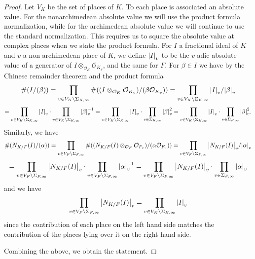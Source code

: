 \documentclass[12pt]{amsart}
\theoremstyle{remark}
\theoremstyle{definition}
\begin{document}
\begin{proof} Let $V_K$ be the set of places of $K$. To each place is associated an absolute value. For the nonarchimedean absolute value we will use the product formula normalization, while for the archimedean absolute value we will continue to use the standard normalization. This requires us to square the absolute value at complex places when we state the product formula. For $I$ a fractional ideal of $K$ and $v$ a non-archimedean place of $K$, we define $\abs{I}_v$ to be the $v$-adic absolute value of a generator of $I \otimes_{\mathcal O_K} \mathcal O_{K_v}$, and the same for $F$. For $\beta \in I$ we have by the Chinese remainder theorem and the product formula
\[ \# (I/(\beta)) =\prod_{v \in V_K\setminus \Sigma_{K,\infty}} \# ((I \otimes_{\mathcal O_K} \mathcal O_{K_v})/ (\beta \mathcal O_{K_v})) =\prod_{v \in V_K\setminus \Sigma_{K,\infty}} \abs{I}_v/ \abs{\beta}_v \] \[= \prod_{v \in V_K\setminus \Sigma_{K,\infty}} \abs{I}_v \cdot \prod_{v \in V_K\setminus \Sigma_{K,\infty}}\abs{\beta}_v^{-1}=  \prod_{v \in V_K\setminus \Sigma_{K,\infty}} \abs{I}_v \cdot \prod_{v \in \Sigma_{K,\infty} }\abs{\beta}_v^2 =  \prod_{v \in V_K\setminus \Sigma_{K,\infty}} \abs{I}_v \cdot \prod_{v \in \Sigma_{F,\infty}} \abs{\beta}_v^2.\]
Similarly, we have
\[ \# (N_{K/F}(I)/(\alpha)) =  \prod_{v \in V_F\setminus \Sigma_{F,\infty}} \# (( N_{K/F}(I)\otimes_{\mathcal O_F} \mathcal O_{F_v})/(\alpha \mathcal O_{F_v}))=  \prod_{v \in V_F\setminus \Sigma_{F,\infty}} \abs{N_{K/F}(I)}_v/\abs{\alpha}_v  \] \[ =  \prod_{v \in V_F\setminus \Sigma_{F,\infty}} \abs{N_{K/F}(I)}_v \cdot  \prod_{v \in V_F\setminus \Sigma_{F,\infty}}  \abs{\alpha}_v^{-1}=  \prod_{v \in V_F\setminus \Sigma_{F,\infty}}\abs{N_{K/F}(I)}_v \cdot \prod_{v \in \Sigma_{F,\infty} }\abs{\alpha}_v \]
and we have
\[  \prod_{v \in V_F\setminus \Sigma_{F,\infty}} \abs{N_{K/F}(I)}_v  = \prod_{v \in V_K\setminus \Sigma_{K,\infty}} \abs{I}_v\] since the contribution of each place on the left hand side matches the contribution of the places lying over it on the right hand side.

Combining the above, we obtain the statement. \end{proof}
\end{document}
